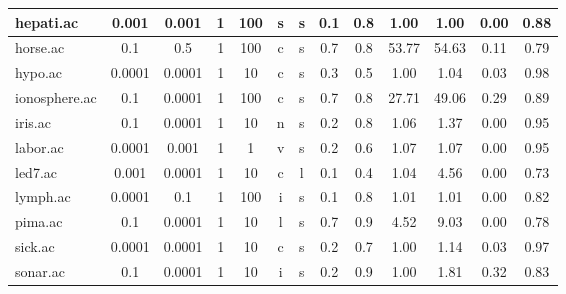 \begin{table}[htbp]
\begin{tabular}{|l|c|c|c|c|c|c|c|c||c|c|c|c|}
		\hline
		hepati.ac      & 0.001    & 0.001       & 1              & 100      & s                   & s        & 0.1    & 0.8   & 1.00           & 1.00           & 0.00           & 0.88           \\
		\hline
		horse.ac       & 0.1      & 0.5         & 1              & 100      & c                   & s        & 0.7    & 0.8   & 53.77          & 54.63          & 0.11           & 0.79           \\
		\hline
		hypo.ac        & 0.0001   & 0.0001      & 1              & 10       & c                   & s        & 0.3    & 0.5   & 1.00           & 1.04           & 0.03           & 0.98           \\
		\hline
		ionosphere.ac  & 0.1      & 0.0001      & 1              & 100      & c                   & s        & 0.7    & 0.8   & 27.71          & 49.06          & 0.29           & 0.89           \\
		\hline
		iris.ac        & 0.1      & 0.0001      & 1              & 10       & n                   & s        & 0.2    & 0.8   & 1.06           & 1.37           & 0.00           & 0.95           \\
		\hline
		labor.ac       & 0.0001   & 0.001       & 1              & 1        & v                   & s        & 0.2    & 0.6   & 1.07           & 1.07           & 0.00           & 0.95           \\
		\hline
		led7.ac        & 0.001    & 0.0001      & 1              & 10       & c                   & l        & 0.1    & 0.4   & 1.04           & 4.56           & 0.00           & 0.73           \\
		\hline
		lymph.ac       & 0.0001   & 0.1         & 1              & 100      & i                   & s        & 0.1    & 0.8   & 1.01           & 1.01           & 0.00           & 0.82           \\
		\hline
		pima.ac        & 0.1      & 0.0001      & 1              & 10       & l                   & s        & 0.7    & 0.9   & 4.52           & 9.03           & 0.00           & 0.78           \\
		\hline
		sick.ac        & 0.0001   & 0.0001      & 1              & 10       & c                   & s        & 0.2    & 0.7   & 1.00           & 1.14           & 0.03           & 0.97           \\
		\hline
		sonar.ac       & 0.1      & 0.0001      & 1              & 10       & i                   & s        & 0.2    & 0.9   & 1.00           & 1.81           & 0.32           & 0.83           \\

\end{tabular}
\end{table}
